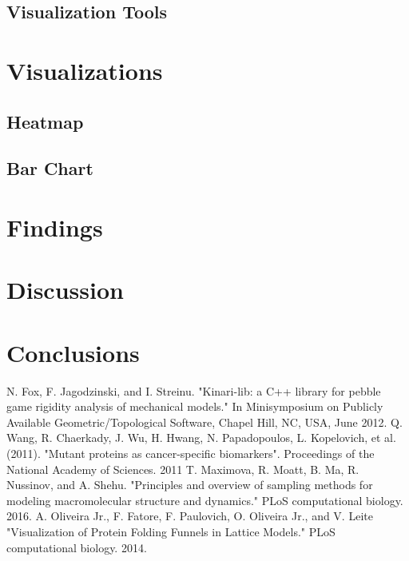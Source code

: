 \documentclass[10pt]{IEEEtran}
\begin{document}
\subsection{Visualization Tools}\label{AA}

\section{Visualizations}
\subsection{Heatmap}\label{AA}
\subsection{Bar Chart}\label{AA}


\section{Findings}


\section{Discussion}

\section{Conclusions}



\begin{thebibliography}{00}
 N. Fox, F. Jagodzinski, and I. Streinu. "Kinari-lib: a C++ library for pebble game rigidity analysis of mechanical models." In Minisymposium on Publicly Available Geometric/Topological Software, Chapel Hill, NC, USA, June 2012.
 Q. Wang, R. Chaerkady, J. Wu, H. Hwang, N. Papadopoulos, L. Kopelovich, et al. (2011). "Mutant proteins as cancer-specific biomarkers". Proceedings of the National Academy of Sciences. 2011
 T. Maximova, R. Moatt, B. Ma, R. Nussinov, and A. Shehu. "Principles and overview of sampling methods for modeling macromolecular structure and dynamics." PLoS computational biology. 2016.
 A. Oliveira Jr., F. Fatore, F. Paulovich, O. Oliveira Jr., and V. Leite  "Visualization of Protein Folding Funnels in Lattice Models." PLoS computational biology. 2014.


\end{thebibliography}
\end{document}
